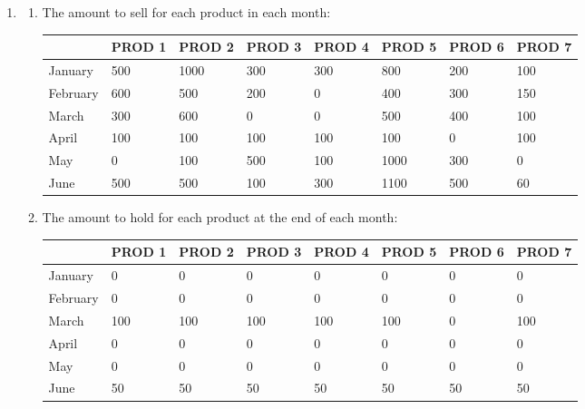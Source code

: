 \documentclass[12pt,a4paper]{article}
\makeatletter
\newtheorem*{solution}{Solution}
\theoremstyle{definition}
\renewenvironment{solution}[1][Solution] {\par\pushQED{\qed}\normalfont\topsep6\p@\@plus6\p@\relax\trivlist\item[\hskip\labelsep\bfseries#1\@addpunct{.}]\ignorespaces}{\popQED\endtrivlist\@endpefalse} \makeatother
\makeatother
\begin{document}
\begin{enumerate}
\begin{solution}
\begin{enumerate}
\begin{enumerate}
\begin{enumerate}
\item The amount to sell for each product in each month:
	\begin{table}[htbp]
      \scriptsize
      \centering
      \renewcommand\arraystretch{1.1}
      \begin{tabular}{m{} m{}<{\centering} m{}<{\centering} m{}<{\centering} m{}<{\centering} m{}<{\centering} m{}<{\centering} m{}<{\centering}}
      \hline
       & \textbf{PROD 1} & \textbf{PROD 2} & \textbf{PROD 3} & \textbf{PROD 4} & \textbf{PROD 5} & \textbf{PROD 6} &  \textbf{PROD 7} \\\hline
      January & 500 & 1000 & 300 & 300 & 800 & 200 & 100 \\
      February & 600 & 500 & 200 & 0 & 400 & 300 & 150 \\
      March & 300 & 600 & 0 & 0 & 500 & 400 & 100 \\
      April & 100 & 100 & 100 & 100 & 100 & 0 & 100 \\
      May & 0 & 100 & 500 & 100 & 1000 & 300 & 0 \\
      June & 500 & 500 & 100 & 300 & 1100 & 500 & 60 \\
      \hline
      \end{tabular}
    \end{table}
    
\item The amount to hold for each product at the end of each month:
\begin{table}[H]
      \scriptsize
      \centering
      \renewcommand\arraystretch{1.1}
      \begin{tabular}{m{} m{}<{\centering} m{}<{\centering} m{}<{\centering} m{}<{\centering} m{}<{\centering} m{}<{\centering} m{}<{\centering}}
      \hline
       & \textbf{PROD 1} & \textbf{PROD 2} & \textbf{PROD 3} & \textbf{PROD 4} & \textbf{PROD 5} & \textbf{PROD 6} &  \textbf{PROD 7} \\\hline
      January & 0 & 0 & 0 & 0 & 0 & 0 & 0 \\
      February & 0 & 0 & 0 & 0 & 0 & 0 & 0 \\
      March & 100 & 100 & 100 & 100 & 100 & 0 & 100 \\
      April & 0 & 0 & 0 & 0 & 0 & 0 & 0 \\
      May & 0 & 0 & 0 & 0 & 0 & 0 & 0 \\
      June & 50 & 50 & 50 & 50 & 50 & 50 & 50 \\
      \hline
      \end{tabular}
    \end{table}
    

\end{enumerate}
\end{enumerate}
\end{enumerate}
\end{solution}
\end{enumerate}
\end{document}
